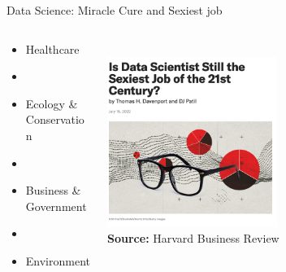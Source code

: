 \begin{frame}{Data Science: Miracle Cure and Sexiest job}
 
 \begin{columns}
 \begin{column}{0.4\textwidth}
 \begin{itemize}
     \item Healthcare 
     \item []
     \item Ecology \& Conservation 
     \item []
     \item Business \& Government 
     \item []
     \item Environment
 \end{itemize}
 \end{column}
 \begin{column}{0.6\textwidth}
    \centering
    \vspace{2em}
    \\
    \includegraphics[width = 0.55\textwidth]{images/Screenshot 2022-08-31 at 11.29.17.png}
    \\
    \footnotesize{\textbf{Source:} Harvard Business Review}
 \end{column}
 \end{columns}
\end{frame} 

